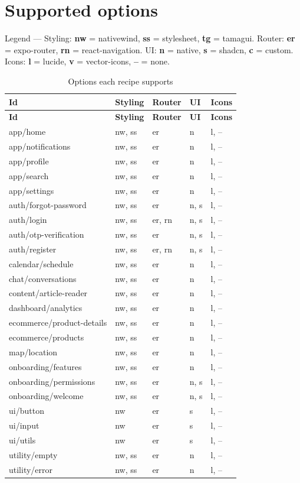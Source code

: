 \section{Supported options}

Legend --- Styling: \textbf{nw} = nativewind, \textbf{ss} = stylesheet,
\textbf{tg} = tamagui. Router: \textbf{er} = expo-router, \textbf{rn} =
react-navigation. UI: \textbf{n} = native, \textbf{s} = shadcn, \textbf{c} =
custom. Icons: \textbf{l} = lucide, \textbf{v} = vector-icons, \textbf{--} =
none.

\begin{longtable}{@{}L{3.8cm}L{2.7cm}L{2.2cm}L{2.2cm}L{2.9cm}@{}}
\caption{Options each recipe supports}\\
\toprule
\textbf{Id} & \textbf{Styling} & \textbf{Router} & \textbf{UI} & \textbf{Icons} \\
\midrule
\endfirsthead
\toprule
\textbf{Id} & \textbf{Styling} & \textbf{Router} & \textbf{UI} & \textbf{Icons} \\
\midrule
\endhead
app/home & nw, ss & er & n & l, -- \\
app/notifications & nw, ss & er & n & l, -- \\
app/profile & nw, ss & er & n & l, -- \\
app/search & nw, ss & er & n & l, -- \\
app/settings & nw, ss & er & n & l, -- \\
auth/forgot-password & nw, ss & er & n, s & l, -- \\
auth/login & nw, ss & er, rn & n, s & l, -- \\
auth/otp-verification & nw, ss & er & n, s & l, -- \\
auth/register & nw, ss & er, rn & n, s & l, -- \\
calendar/schedule & nw, ss & er & n & l, -- \\
chat/conversations & nw, ss & er & n & l, -- \\
content/article-reader & nw, ss & er & n & l, -- \\
dashboard/analytics & nw, ss & er & n & l, -- \\
ecommerce/product-details & nw, ss & er & n & l, -- \\
ecommerce/products & nw, ss & er & n & l, -- \\
map/location & nw, ss & er & n & l, -- \\
onboarding/features & nw, ss & er & n & l, -- \\
onboarding/permissions & nw, ss & er & n, s & l, -- \\
onboarding/welcome & nw, ss & er & n, s & l, -- \\
ui/button & nw & er & s & l, -- \\
ui/input & nw & er & s & l, -- \\
ui/utils & nw & er & s & l, -- \\
utility/empty & nw, ss & er & n & l, -- \\
utility/error & nw, ss & er & n & l, -- \\
\bottomrule
\end{longtable}

